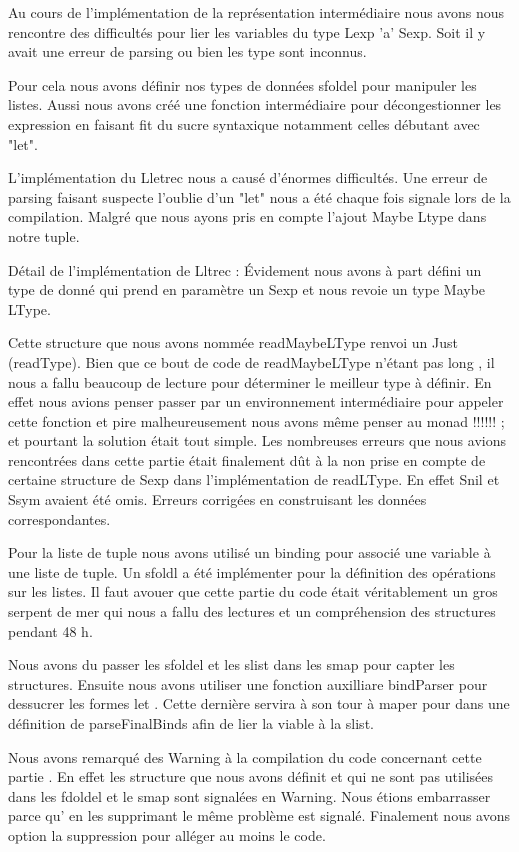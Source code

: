 \documentclass{article}
\begin{document}
 

 Au cours de l'implémentation de la représentation intermédiaire nous avons nous rencontre des difficultés pour lier les variables du type Lexp 'a' Sexp. Soit il y avait une erreur de parsing ou bien les type sont inconnus. 

 Pour cela nous avons définir nos types de données sfoldel pour manipuler les listes. Aussi  nous avons créé une fonction intermédiaire pour décongestionner les  expression en faisant fit du sucre syntaxique notamment celles débutant avec "let". 

 L'implémentation du Lletrec nous a causé d'énormes difficultés. Une erreur de parsing faisant suspecte l'oublie d'un "let" nous a été chaque fois signale lors de la compilation. Malgré que nous ayons pris en compte l’ajout Maybe Ltype dans notre tuple.

Détail de l’implémentation de Lltrec : Évidement nous avons à part défini un type de donné qui prend en paramètre un Sexp et nous revoie un type Maybe LType.

Cette structure que nous avons nommée readMaybeLType renvoi un Just (readType). Bien que ce bout de code de readMaybeLType n’étant pas long , il nous a fallu beaucoup de lecture pour déterminer le meilleur type à définir. En effet nous avions penser passer par un environnement intermédiaire pour appeler cette fonction et pire malheureusement nous avons même penser au monad !!!!!! ; et pourtant la solution était tout simple. Les nombreuses erreurs que nous avions rencontrées dans cette partie était finalement dût à la non prise en compte de certaine structure de Sexp dans l’implémentation de readLType. En effet Snil et Ssym avaient été omis. Erreurs corrigées en construisant les données correspondantes.

Pour la liste de tuple nous avons utilisé un binding pour associé une variable à une liste de tuple. Un sfoldl   a été implémenter pour la définition des opérations sur les listes. Il faut avouer que cette partie du code était véritablement un gros serpent de mer qui nous a fallu des lectures et un compréhension des structures pendant 48 h.

Nous avons du passer les sfoldel et les slist dans les smap pour capter les structures. Ensuite nous avons utiliser une fonction auxilliare bindParser pour dessucrer les formes let . Cette dernière servira à son tour à maper pour dans une définition de parseFinalBinds afin de lier la viable à la slist.

Nous avons remarqué des Warning à la compilation du code concernant cette partie . En effet les structure que nous avons définit et qui ne sont pas utilisées dans les fdoldel et le smap sont signalées en Warning. Nous étions embarrasser parce qu’ en les supprimant le même problème est signalé. Finalement nous avons option la suppression pour alléger au moins le code.
\end{document}
